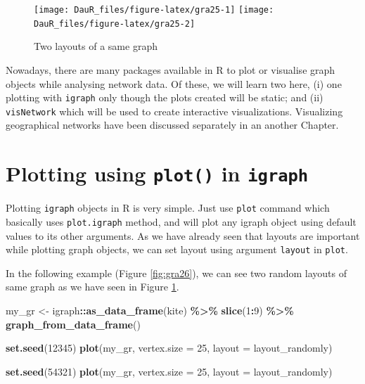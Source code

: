 \documentclass[
]{book}
\newenvironment{Shaded}{\begin{snugshade}}{\end{snugshade}}
\newcommand{\AttributeTok}[1]{\textcolor[rgb]{0.13,0.29,0.53}{#1}}
\newcommand{\DecValTok}[1]{\textcolor[rgb]{0.00,0.00,0.81}{#1}}
\newcommand{\FunctionTok}[1]{\textcolor[rgb]{0.13,0.29,0.53}{\textbf{#1}}}
\newcommand{\NormalTok}[1]{#1}
\newcommand{\OtherTok}[1]{\textcolor[rgb]{0.56,0.35,0.01}{#1}}
\newcommand{\SpecialCharTok}[1]{\textcolor[rgb]{0.81,0.36,0.00}{\textbf{#1}}}
\begin{document}
\begin{figure}

{\centering \texttt{[image: DauR\_files/figure-latex/gra25-1]} \texttt{[image: DauR\_files/figure-latex/gra25-2]} 

}

\caption{Two layouts of a same graph}\label{fig:gra25}
\end{figure}

Nowadays, there are many packages available in R to plot or visualise graph objects while analysing network data. Of these, we will learn two here, (i) one plotting with \texttt{igraph} only though the plots created will be static; and (ii) \texttt{visNetwork} which will be used to create interactive visualizations. Visualizing geographical networks have been discussed separately in an another Chapter.

\hypertarget{plotting-using-plot-in-igraph}{%
\section{\texorpdfstring{Plotting using \texttt{plot()} in \texttt{igraph}}{Plotting using plot() in igraph}}\label{plotting-using-plot-in-igraph}}

Plotting \texttt{igraph} objects in R is very simple. Just use \texttt{plot} command which basically uses \texttt{plot.igraph} method, and will plot any igraph object using default values to its other arguments. As we have already seen that layouts are important while plotting graph objects, we can set layout using argument \texttt{layout} in \texttt{plot}.

In the following example (Figure \ref{fig:gra26}), we can see two random layouts of same graph as we have seen in Figure \ref{fig:gra25}.

\begin{Shaded}
\begin{Highlighting}[]
\NormalTok{my\_gr }\OtherTok{\textless{}{-}}\NormalTok{ igraph}\SpecialCharTok{::}\FunctionTok{as\_data\_frame}\NormalTok{(kite) }\SpecialCharTok{\%\textgreater{}\%} 
  \FunctionTok{slice}\NormalTok{(}\DecValTok{1}\SpecialCharTok{:}\DecValTok{9}\NormalTok{) }\SpecialCharTok{\%\textgreater{}\%} 
  \FunctionTok{graph\_from\_data\_frame}\NormalTok{()}

\FunctionTok{set.seed}\NormalTok{(}\DecValTok{12345}\NormalTok{)}
\FunctionTok{plot}\NormalTok{(my\_gr, }\AttributeTok{vertex.size =} \DecValTok{25}\NormalTok{, }\AttributeTok{layout =}\NormalTok{ layout\_randomly)}

\FunctionTok{set.seed}\NormalTok{(}\DecValTok{54321}\NormalTok{)}
\FunctionTok{plot}\NormalTok{(my\_gr, }\AttributeTok{vertex.size =} \DecValTok{25}\NormalTok{, }\AttributeTok{layout =}\NormalTok{ layout\_randomly)}
\end{Highlighting}
\end{Shaded}
\end{document}
